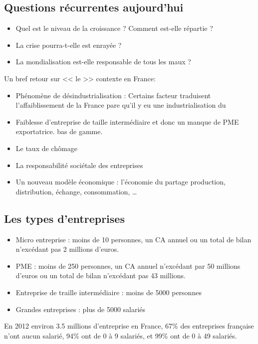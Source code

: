 	\subsection{Questions récurrentes aujourd'hui}
	\begin{itemize}
		\item Quel est le niveau de la croissance ? Comment est-elle répartie ? 
		\item La crise pourra-t-elle est enrayée ? 
		\item La mondialisation est-elle responsable de tous les maux ? 
	\end{itemize}

	Un bref retour sur << le >> contexte en France:
	\begin{itemize}
		\item Phénomène de désindustrialisation : Certains facteur traduisent l'affaiblissement de la France pare qu'il y  eu une industrialisation du
		\item Faiblesse d'entreprise de taille intermédiaire et donc un manque de PME exportatrice.  bas de gamme.
		\item Le taux de chômage
		\item La responsabilité sociétale des entreprises
		\item Un nouveau modèle économique : l'économie du partage  production, distribution, échange, consommation, \ldots
	\end{itemize}

	\subsection{Les types d'entreprises}
	\begin{itemize}
		\item Micro entreprise : moins de 10 personnes, un CA annuel ou un total de bilan n'excédant pas 2 millions d'euros.
		\item PME : moins de 250 personnes, un CA annuel n'excédant par 50 millions d'euros ou un total de bilan n'excédant pas 43 millions.
		\item Entreprise de traille intermédiaire : moins de 5000 personnes
		\item Grandes entreprises : plus de 5000 salariés
	\end{itemize}

	En 2012 environ 3.5 millions d'entreprise en France, 67\% des entreprises française n'ont aucun salarié, 94\% ont de 0 à 9 salariés, et 99\% ont de
	0 à 49 salariés.

